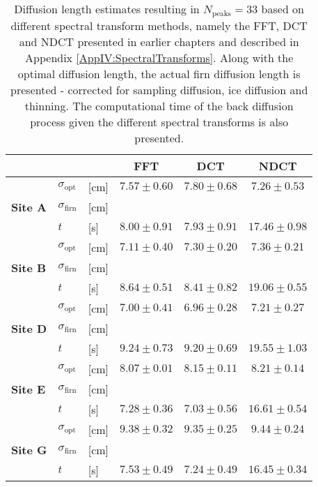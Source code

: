 \documentclass[../../CompleteThesis2/Complete_2ndDraft]{subfiles}
\begin{document}
\begin{table}[ht]
	\centering
	\begin{tabular}{l l l | c | c | c}
		& & & FFT & DCT & NDCT \\
		\hline
		\hline 
		\multirow{3}{*}{\textbf{Site A}} & $\sigma_{\text{opt}}$ & [cm] & $7.57 \pm 0.60$ & $7.80 \pm 0.68$ & $7.26 \pm 0.53$ \\
		& $\sigma_{\text{firn}}$ & [cm] & & & \\
		& $t$ & [s] & $8.00 \pm 0.91$ & $7.93 \pm 0.91$ & $17.46 \pm 0.98$ \\
		\hline
		
		\multirow{3}{*}{\textbf{Site B}} & $\sigma_{\text{opt}}$ & [cm] & $7.11 \pm 0.40$ & $7.30 \pm 0.20$ & $7.36 \pm 0.21$ \\
		& $\sigma_{\text{firn}}$ & [cm] & & & \\
		& $t$ & [s] & $8.64 \pm 0.51$ & $8.41 \pm 0.82$ & $19.06 \pm 0.55$ \\
		\hline
		
		\multirow{3}{*}{\textbf{Site D}} & $\sigma_{\text{opt}}$ & [cm] & $7.00 \pm 0.41$ & $6.96 \pm 0.28$ & $7.21 \pm 0.27$ \\
		& $\sigma_{\text{firn}}$ & [cm] & & & \\
		& $t$ & [s] & $9.24 \pm 0.73$ & $9.20 \pm 0.69$ & $19.55 \pm 1.03$ \\
		\hline
		
		\multirow{3}{*}{\textbf{Site E}} & $\sigma_{\text{opt}}$ & [cm] & $8.07 \pm 0.01$ & $8.15 \pm 0.11$ & $8.21 \pm 0.14$ \\
		& $\sigma_{\text{firn}}$ & [cm] & & & \\
		& $t$ & [s] & $7.28 \pm 0.36$ & $7.03 \pm 0.56$ & $16.61 \pm 0.54$ \\
		\hline
		
		\multirow{3}{*}{\textbf{Site G}} & $\sigma_{\text{opt}}$ & [cm] & $9.38 \pm 0.32$ & $9.35 \pm 0.25$ & $9.44 \pm 0.24$ \\
		& $\sigma_{\text{firn}}$ & [cm] & & & \\
		& $t$ & [s] & $7.53 \pm 0.49$ & $7.24 \pm 0.49$ & $16.45 \pm 0.34$ \\
		\hline
	\end{tabular}
	\caption[$\sigma$ Estimates Given Spectral Transforms]{\small Diffusion length estimates resulting in $N_{\text{peaks}}=33$ based on different spectral transform methods, namely the FFT, DCT and NDCT presented in earlier chapters and described in Appendix \ref{AppIV:SpectralTransforms}. Along with the optimal diffusion length, the actual firn diffusion length is presented - corrected for sampling diffusion, ice diffusion and thinning. The computational time of the back diffusion process given the different spectral transforms is also presented.}
	\label{Tab:DiffLens_SpecTrans}
\end{table}
\end{document}
